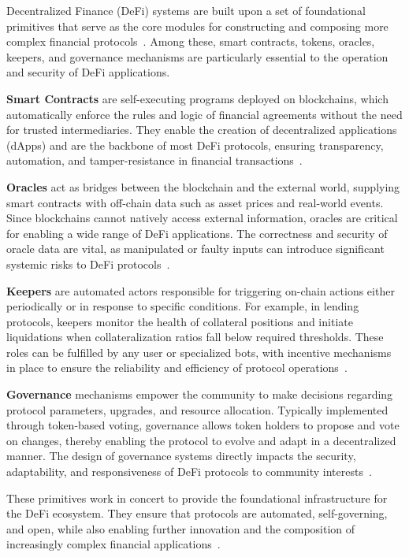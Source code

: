 \documentclass[conference]{IEEEtran}
\begin{document}
Decentralized Finance (DeFi) systems are built upon a set of foundational primitives that serve as the core modules for constructing and composing more complex financial protocols~\cite{werner2021sok}. Among these, smart contracts, tokens, oracles, keepers, and governance mechanisms are particularly essential to the operation and security of DeFi applications.

\textbf{Smart Contracts} are self-executing programs deployed on blockchains, which automatically enforce the rules and logic of financial agreements without the need for trusted intermediaries. They enable the creation of decentralized applications (dApps) and are the backbone of most DeFi protocols, ensuring transparency, automation, and tamper-resistance in financial transactions~\cite{werner2021sok}.

\textbf{Oracles} act as bridges between the blockchain and the external world, supplying smart contracts with off-chain data such as asset prices and real-world events. Since blockchains cannot natively access external information, oracles are critical for enabling a wide range of DeFi applications. The correctness and security of oracle data are vital, as manipulated or faulty inputs can introduce significant systemic risks to DeFi protocols~\cite{werner2021sok}.

\textbf{Keepers} are automated actors responsible for triggering on-chain actions either periodically or in response to specific conditions. For example, in lending protocols, keepers monitor the health of collateral positions and initiate liquidations when collateralization ratios fall below required thresholds. These roles can be fulfilled by any user or specialized bots, with incentive mechanisms in place to ensure the reliability and efficiency of protocol operations~\cite{werner2021sok}.

\textbf{Governance} mechanisms empower the community to make decisions regarding protocol parameters, upgrades, and resource allocation. Typically implemented through token-based voting, governance allows token holders to propose and vote on changes, thereby enabling the protocol to evolve and adapt in a decentralized manner. The design of governance systems directly impacts the security, adaptability, and responsiveness of DeFi protocols to community interests~\cite{werner2021sok}.

These primitives work in concert to provide the foundational infrastructure for the DeFi ecosystem. They ensure that protocols are automated, self-governing, and open, while also enabling further innovation and the composition of increasingly complex financial applications~\cite{werner2021sok}.
\end{document}
